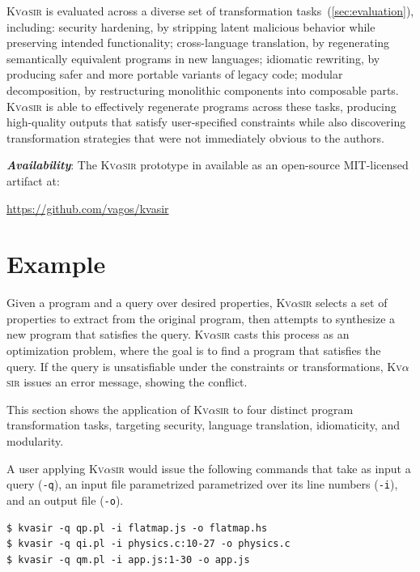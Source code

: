 \documentclass[nonacm,sigplan]{acmart}
\newcommand{\sys}{{\scshape Kv{$\alpha$}sir}\xspace}
\newcommand{\heading}[1]{\vspace{2pt}\noindent\textbf{\emph{#1}}:\enspace}
\newcommand{\ttt}[1]{\texttt{#1}\xspace}
\begin{document}
\sys is evaluated across a diverse set of transformation tasks~(\cref{sec:evaluation}), including:
	security hardening, by stripping latent malicious behavior while preserving intended functionality;
	cross-language translation, by regenerating semantically equivalent programs in new languages;
	idiomatic rewriting, by producing safer and more portable variants of legacy code;
	modular decomposition, by restructuring monolithic components into composable parts.
\sys is able to effectively regenerate programs across these tasks, producing high-quality outputs that satisfy user-specified constraints while also discovering transformation strategies that were not immediately obvious to the authors.

\heading{Availability}
The \sys prototype in available as an open-source MIT-licensed artifact at:
\begin{center}
  \url{https://github.com/vagos/kvasir}
\end{center}

\section{Example}
\label{sec:example}

Given a program and a query over desired properties,
\sys selects a set
of properties to extract from the original program, then attempts to synthesize
a new program that satisfies the query.
\sys casts this process as an optimization problem, where the goal is to find a
program that satisfies the query.
If the query is unsatisfiable under
the constraints or transformations, \sys issues an error
message, showing the conflict.

This section shows the application of \sys
to four distinct program transformation tasks, 
targeting security,
language translation,
idiomaticity,
and modularity.

A user applying \sys would issue the following commands that 
take as input a query (\ttt{-q}), an input file parametrized parametrized over its line numbers (\ttt{-i}), and an output file (\ttt{-o}).
\begin{verbatim}
$ kvasir -q qp.pl -i flatmap.js -o flatmap.hs
$ kvasir -q qi.pl -i physics.c:10-27 -o physics.c
$ kvasir -q qm.pl -i app.js:1-30 -o app.js
\end{verbatim}
\end{document}
